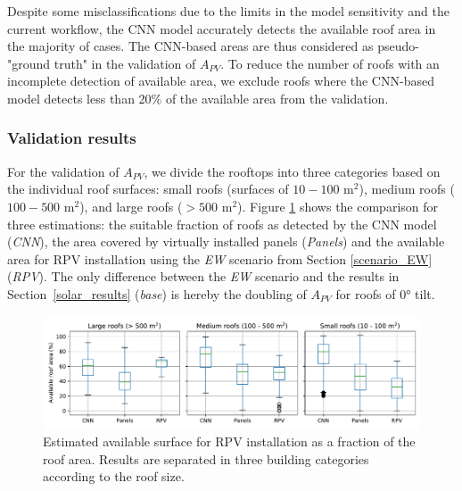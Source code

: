 Despite some misclassifications due to the limits in the model sensitivity and the current workflow, the CNN model accurately detects the available roof area in the majority of cases.
The CNN-based areas are thus considered as pseudo-"ground truth" in the validation of $A_{PV}$.
To reduce the number of roofs with an incomplete detection of available area, we exclude roofs where the CNN-based model detects less than 20\% of the available area from the validation.

\subsubsection{Validation results}

For the validation of $A_{PV}$, we divide the rooftops into three categories based on the individual roof surfaces: small roofs (surfaces of $10-100$ m$^2$), medium roofs ($100-500$ m$^2$), and large roofs ($>500$ m$^2$). 
Figure \ref{fig:CNN_boxplots} shows the comparison for three estimations: the suitable fraction of roofs as detected by the CNN model (\textit{CNN}), the area covered by virtually installed panels (\textit{Panels}) and the available area for RPV installation using the \textit{EW} scenario from Section \ref{scenario_EW} (\textit{RPV}). The only difference between the \textit{EW} scenario and the results in Section~\ref{solar_results} (\textit{base}) is hereby the doubling of $A_{PV}$ for roofs of 0° tilt.

\begin{figure}[tb]
\centering
\includegraphics[width=\linewidth]{images/Figs/boxplots_area_cmp_min20pct.pdf}
\caption{Estimated available surface for RPV installation as a fraction of the roof area. Results are separated in three building categories according to the roof size.}
\label{fig:CNN_boxplots}
\end{figure}

